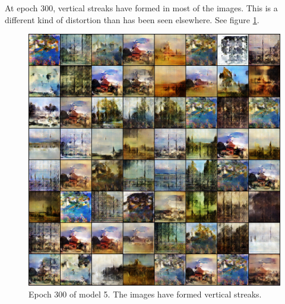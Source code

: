 \documentclass[11pt,letterpaper]{article}
\begin{document}
				At epoch 300, vertical streaks have formed in most of the images.
				This is a different kind of distortion than has been seen elsewhere.
				See figure \ref{fig:wa128:epoch300generator}.
				\begin{figure}
					\centering
					\includegraphics[width=1.0\linewidth]{results/model5/epoch300_generator}
					\caption{Epoch 300 of model 5. The images have formed vertical streaks.}
					\label{fig:wa128:epoch300generator}
				\end{figure}
\end{document}
